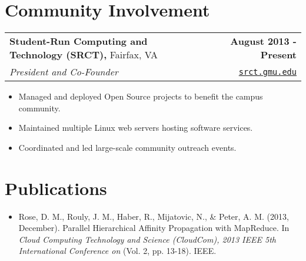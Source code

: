 \documentclass[letterpaper]{article}
\newenvironment{details}
{\begin{itemize}}
{\end{itemize}}
\begin{document}
%


  \section{Community Involvement}
  \noindent
  \begin{tabularx}{\textwidth}{@{}X r@{}}
    \textbf{Student-Run Computing and Technology (SRCT),} Fairfax, VA & \textbf{August 2013 - Present} \\
    \emph{President and Co-Founder} & \texttt{\href{srct.gmu.edu}{srct.gmu.edu}}
  \end{tabularx}

  \begin{details}
  \item Managed and deployed Open Source projects to benefit the campus community.
  \item Maintained multiple Linux web servers hosting software services.
  \item Coordinated and led large-scale community outreach events.
  \end{details}


  \section{Publications}
  \noindent
  \begin{details}
  \item Rose, D. M., Rouly, J. M., Haber, R., Mijatovic, N., \& Peter, A.
  M.  (2013, December). Parallel Hierarchical Affinity Propagation with
  MapReduce. In \emph{Cloud Computing Technology and Science (CloudCom),
  2013 IEEE 5th International Conference on} (Vol. 2, pp. 13-18). IEEE.

  \end{details}
\end{document}
